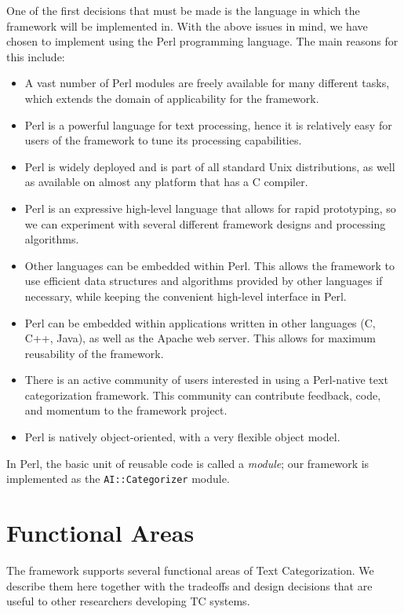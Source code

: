 \documentclass[a4paper,twocolumn]{article}
\begin{document}
One of the first decisions that must be made is the language in which the framework will be implemented in.  With the above issues in mind, we have chosen to implement using the Perl programming language. \cite{Wall:00}  The main reasons for this include:

\begin{itemize}
\item A vast number of Perl modules are freely available for many different tasks, which extends the domain of applicability for the framework.
\item Perl is a powerful language for text processing, hence it is relatively easy for users of the framework to tune its processing capabilities.
\item Perl is widely deployed and is part of all standard Unix distributions, as well as available on almost any platform that has a C compiler.
\item Perl is an expressive high-level language that allows for rapid prototyping, so we can experiment with several different framework designs and processing algorithms.
\item Other languages can be embedded within Perl.  This allows the framework to use efficient data structures and algorithms provided by other languages if necessary, while keeping the convenient high-level interface in Perl.
\item Perl can be embedded within applications written in other languages (C, C++, Java), as well as the Apache web server.  This allows for maximum reusability of the framework.
\item There is an active community of users interested in using a Perl-native text categorization framework.  This community can contribute feedback, code, and momentum to the framework project.
\item Perl is natively object-oriented, with a very flexible object model. \cite{conway:99}
\end{itemize}

In Perl, the basic unit of reusable code is called a \emph{module};
our framework is implemented as the \texttt{AI::Categorizer} module.

\section{Functional Areas}

The framework supports several functional areas of Text
Categorization. We describe them here together with the tradeoffs and
design decisions that are useful to other researchers developing TC
systems.
\end{document}
